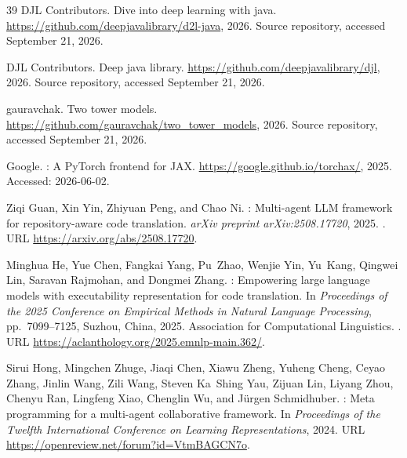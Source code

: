 \documentclass{article}
\begin{document}
\begin{thebibliography}{39}
{DJL Contributors}.
\newblock Dive into deep learning with java.
\newblock \url{https://github.com/deepjavalibrary/d2l-java},
  2026{}.
\newblock Source repository, accessed September 21, 2026.

{DJL Contributors}.
\newblock Deep java library.
\newblock \url{https://github.com/deepjavalibrary/djl}, 2026{}.
\newblock Source repository, accessed September 21, 2026.

{gauravchak}.
\newblock Two tower models.
\newblock \url{https://github.com/gauravchak/two_tower_models}, 2026.
\newblock Source repository, accessed September 21, 2026.

{Google}.
: A {PyTorch} frontend for {JAX}.
\newblock \url{https://google.github.io/torchax/}, 2025.
\newblock Accessed: 2026-06-02.

Ziqi Guan, Xin Yin, Zhiyuan Peng, and Chao Ni.
: Multi-agent {LLM} framework for repository-aware
  code translation.
\newblock \emph{arXiv preprint arXiv:2508.17720}, 2025.
\newblock {}.
\newblock URL \url{https://arxiv.org/abs/2508.17720}.

Minghua He, Yue Chen, Fangkai Yang, Pu~Zhao, Wenjie Yin, Yu~Kang, Qingwei Lin,
  Saravan Rajmohan, and Dongmei Zhang.
: Empowering large language models with executability
  representation for code translation.
\newblock In \emph{Proceedings of the 2025 Conference on Empirical Methods in
  Natural Language Processing}, pp.\  7099--7125, Suzhou, China, 2025.
  Association for Computational Linguistics.
\newblock {}.
\newblock URL \url{https://aclanthology.org/2025.emnlp-main.362/}.

Sirui Hong, Mingchen Zhuge, Jiaqi Chen, Xiawu Zheng, Yuheng Cheng, Ceyao Zhang,
  Jinlin Wang, Zili Wang, Steven Ka~Shing Yau, Zijuan Lin, Liyang Zhou, Chenyu
  Ran, Lingfeng Xiao, Chenglin Wu, and J{\"u}rgen Schmidhuber.
: Meta programming for a multi-agent collaborative
  framework.
\newblock In \emph{Proceedings of the Twelfth International Conference on
  Learning Representations}, 2024.
\newblock URL \url{https://openreview.net/forum?id=VtmBAGCN7o}.


\end{thebibliography}
\end{document}
